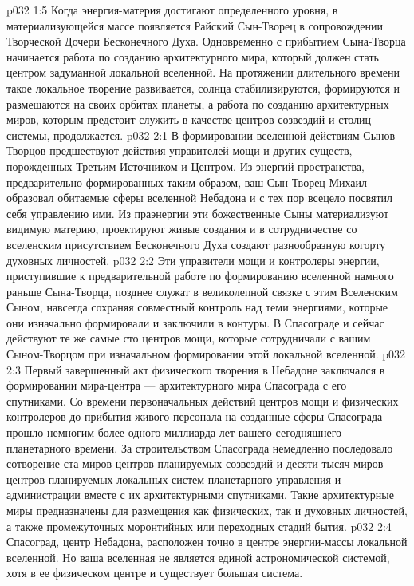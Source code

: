 \vs p032 1:5 \pc Когда энергия\hyp{}материя достигают определенного уровня, в материализующейся массе появляется Райский Сын\hyp{}Творец в сопровождении Творческой Дочери Бесконечного Духа. Одновременно с прибытием Сына\hyp{}Творца начинается работа по созданию архитектурного мира, который должен стать центром задуманной локальной вселенной. На протяжении длительного времени такое локальное творение развивается, солнца стабилизируются, формируются и размещаются на своих орбитах планеты, а работа по созданию архитектурных миров, которым предстоит служить в качестве центров созвездий и столиц системы, продолжается.
\vs p032 2:1 В формировании вселенной действиям Сынов\hyp{}Творцов предшествуют действия управителей мощи и других существ, порожденных Третьим Источником и Центром. Из энергий пространства, предварительно формированных таким образом, ваш Сын\hyp{}Творец Михаил образовал обитаемые сферы вселенной Небадона и с тех пор всецело посвятил себя управлению ими. Из праэнергии эти божественные Сыны материализуют видимую материю, проектируют живые создания и в сотрудничестве со вселенским присутствием Бесконечного Духа создают разнообразную когорту духовных личностей.
\vs p032 2:2 Эти управители мощи и контролеры энергии, приступившие к предварительной работе по формированию вселенной намного раньше Сына\hyp{}Творца, позднее служат в великолепной связке с этим Вселенским Сыном, навсегда сохраняя совместный контроль над теми энергиями, которые они изначально формировали и заключили в контуры. В Спасограде и сейчас действуют те же самые сто центров мощи, которые сотрудничали с вашим Сыном\hyp{}Творцом при изначальном формировании этой локальной вселенной.
\vs p032 2:3 \pc Первый завершенный акт физического творения в Небадоне заключался в формировании мира\hyp{}центра --- архитектурного мира Спасограда с его спутниками. Со времени первоначальных действий центров мощи и физических контролеров до прибытия живого персонала на созданные сферы Спасограда прошло немногим более одного миллиарда лет вашего сегодняшнего планетарного времени. За строительством Спасограда немедленно последовало сотворение ста миров\hyp{}центров планируемых созвездий и десяти тысяч миров\hyp{}центров планируемых локальных систем планетарного управления и администрации вместе с их архитектурными спутниками. Такие архитектурные миры предназначены для размещения как физических, так и духовных личностей, а также промежуточных моронтийных или переходных стадий бытия.
\vs p032 2:4 Спасоград, центр Небадона, расположен точно в центре энергии\hyp{}массы локальной вселенной. Но ваша вселенная не является единой астрономической системой, хотя в ее физическом центре и существует большая система.
